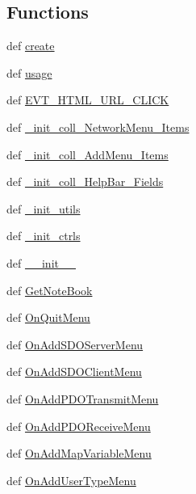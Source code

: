 \subsection*{Functions}
\begin{CompactItemize}
\item 
def \hyperlink{namespacenetworkedit_dda6cbf16074f4596324bd8c75e7a409}{create}
\item 
def \hyperlink{namespacenetworkedit_d1c96437c6338056898af5f7119a2a7c}{usage}
\item 
def \hyperlink{namespacenetworkedit_f4d85792fc654e45170911a58483376e}{EVT\_\-HTML\_\-URL\_\-CLICK}
\item 
def \hyperlink{namespacenetworkedit_0f0b314087ded2fd5edee0b43ebff236}{\_\-init\_\-coll\_\-Network\-Menu\_\-Items}
\item 
def \hyperlink{namespacenetworkedit_941927e6e7615ba804042de3ece1e97f}{\_\-init\_\-coll\_\-Add\-Menu\_\-Items}
\item 
def \hyperlink{namespacenetworkedit_e2c968ea57457a5a0c05104c526e900d}{\_\-init\_\-coll\_\-Help\-Bar\_\-Fields}
\item 
def \hyperlink{namespacenetworkedit_a1cd2a66c69c00d34dffdb3e53101fcd}{\_\-init\_\-utils}
\item 
def \hyperlink{namespacenetworkedit_fe1c1ffc78b7a7416942b40633884018}{\_\-init\_\-ctrls}
\item 
def \hyperlink{namespacenetworkedit_82e0d4ac55ecdf8bf2a154ef2747c7b5}{\_\-\_\-init\_\-\_\-}
\item 
def \hyperlink{namespacenetworkedit_49f12cd3b720322e147f77841999dbd3}{Get\-Note\-Book}
\item 
def \hyperlink{namespacenetworkedit_854bbe7eafaaa933738f2c74569b7ea3}{On\-Quit\-Menu}
\item 
def \hyperlink{namespacenetworkedit_b8badc56d1e65b90cadda0933b7231a1}{On\-Add\-SDOServer\-Menu}
\item 
def \hyperlink{namespacenetworkedit_3ddbeac7f2aa5d9eb954e410c5f9eb0a}{On\-Add\-SDOClient\-Menu}
\item 
def \hyperlink{namespacenetworkedit_ce0a870981c8a339344cefc5d6585033}{On\-Add\-PDOTransmit\-Menu}
\item 
def \hyperlink{namespacenetworkedit_d9b96580122ed08bafeedbdea8aea934}{On\-Add\-PDOReceive\-Menu}
\item 
def \hyperlink{namespacenetworkedit_0b66d8079bf72006032d854ab966d03c}{On\-Add\-Map\-Variable\-Menu}
\item 
def \hyperlink{namespacenetworkedit_d6aa6d1dd5c2e4c1d7b9080e4c6744b0}{On\-Add\-User\-Type\-Menu}

\end{CompactItemize}
